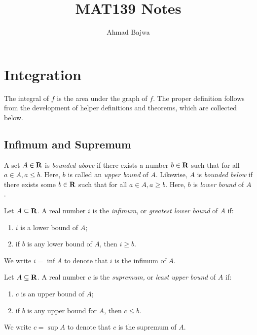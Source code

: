 \documentclass{article}
\title{MAT139 Notes}
\author{Ahmad Bajwa}
\begin{document}
\maketitle
\tableofcontents
\pagebreak

\section{Integration}
    The integral of \(f\) is the area under the graph of \(f\). The proper definition follows from the development of helper definitions and theorems, which are collected below.

    \subsection{Infimum and Supremum}
    
    \begin{defi}[Bounds]
      A set \(A \in \mathbf{R}\) is \emph{bounded above} if there exists a number \(b \in \mathbf{R}\) such that for all \(a \in A, a \leq b\). Here, \(b\) is called an \emph{upper bound} of \(A\). Likewise, \(A\) is \emph{bounded below} if there exists some \(b \in \mathbf{R}\) such that for all \(a \in A, a \geq b\). Here, \(b\) is \emph{lower bound} of \(A\).
      \end{defi}

      \vspace*{5pt}

      \begin{defi}[Infimum]
        Let \(A \subseteq \mathbf{R}\). A real number \(i\) is the \emph{infimum}, or \emph{greatest lower bound} of \(A\) if:
        \begin{enumerate}
          \item \(i\) is a lower bound of \(A\);
          \item if \(b\) is any lower bound of \(A\), then \(i \geq b\).
        \end{enumerate}

        We write \(i = \inf A\) to denote that \(i\) is the infimum of \(A\).
      \end{defi}
      
      \vspace*{5pt}

      \begin{defi}[Supremum]
        Let \(A \subseteq \mathbf{R}\). A real number \(c\) is the \emph{supremum,} or \emph{least upper bound} of \(A\) if:
        \begin{enumerate}
          \item \(c\) is an upper bound of \(A\);
          \item if \(b\) is any upper bound for \(A\), then \(c \leq b\).
        \end{enumerate}

        We write \(c = \sup A\) to denote that \(c\) is the supremum of \(A\).
      \end{defi}
\end{document}

